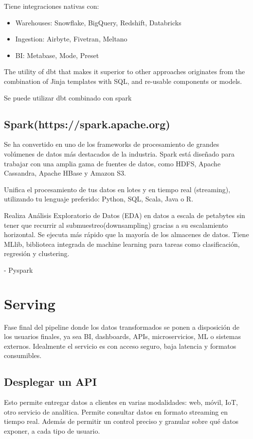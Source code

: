 \documentclass[12pt]{book}
\begin{document}
Tiene integraciones nativas con:
\begin{itemize}
    \item Warehouses: Snowflake, BigQuery, Redshift, Databricks
    \item Ingestion: Airbyte, Fivetran, Meltano
    \item BI: Metabase, Mode, Preset
\end{itemize}

The utility of dbt that makes it superior to other approaches originates from the combination of Jinja templates with SQL, and re-usable components or models.

Se puede utilizar dbt combinado con spark
\subsection{Spark(https://spark.apache.org)}
Se ha convertido en uno de los frameworks de procesamiento de grandes volúmenes de 
datos más destacados de la industria. Spark está diseñado para trabajar con una amplia 
gama de fuentes de datos, como HDFS, Apache Cassandra, Apache HBase y Amazon S3.

Unifica el procesamiento de tus datos en lotes y en tiempo real (streaming), utilizando 
tu lenguaje preferido: Python, SQL, Scala, Java o R.

Realiza Análisis Exploratorio de Datos (EDA) en datos a escala de petabytes sin 
tener que recurrir al submuestreo(downsampling) gracias a su escalamiento 
horizontal. Se ejecuta más rápido que la mayoría de los almacenes de datos.
Tiene MLlib, biblioteca integrada de machine learning para tareas como 
clasificación, regresión y clustering.

- Pyspark

\section{Serving}
Fase final del pipeline donde los datos transformados se ponen a disposición de los usuarios 
finales, ya sea BI, dashboards, APIs, microservicios, ML o sistemas externos. Idealmente el 
servicio es con acceso seguro, baja latencia y formatos consumibles.

\subsection{Desplegar un API}
Esto permite entregar datos a clientes en varias modalidades: web, móvil, IoT, otro servicio de 
analítica. Permite consultar datos en formato streaming en tiempo real. Además de permitir un control 
preciso y granular sobre qué datos exponer, a cada tipo de usuario.
\end{document}
